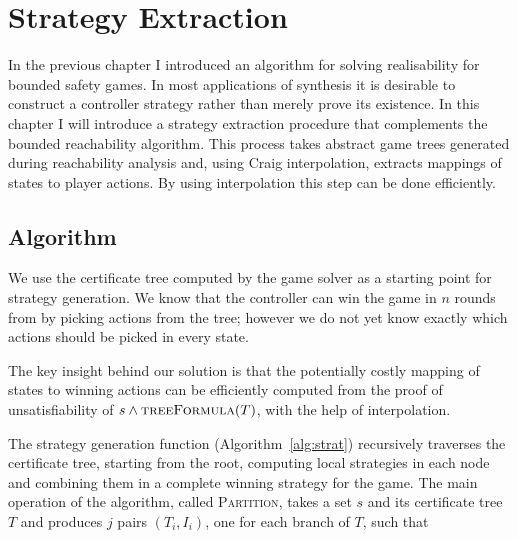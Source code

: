 \chapter{Strategy Extraction}
\label{ch:strategy}

\newcommand{\strategyext}[0]{\textsc{StrategyGen}\xspace}
\newcommand{\genstrategy}{\textsc{StrategyGen}}
\newcommand{\strategy}[0]{\textsc{Strategy}\xspace}
\newcommand{\partition}[0]{\textsc{Partition}\xspace}
\newcommand{\nextf}[0]{\textsc{Next}\xspace}
\newcommand{\ogametree}[0]{\mbox{\sc OppGT}}
\newcommand{\eagametree}[0]{\mbox{\sc AbsGT}'}
\newcommand{\pgametree}[0]{\mbox{\sc Cand}}
\newcommand{\apgametree}[0]{\mbox{\sc AbsSolvedGT}}
\newcommand{\opgametree}[0]{\mbox{\sc Spoiling}}

\renewcommand{\ss}[0]{\mathbf{s}}
\newcommand{\cc}[0]{\mathbf{c}}
\newcommand{\uu}[0]{\mathbf{u}}

\newtheorem{proposition}{Proposition}

In the previous chapter I introduced an algorithm for solving realisability for bounded safety games. In most applications of synthesis it is desirable to construct a controller strategy rather than merely prove its existence. In this chapter I will introduce a strategy extraction procedure that complements the bounded reachability algorithm. This process takes abstract game trees generated during reachability analysis and, using Craig interpolation, extracts mappings of states to player actions. By using interpolation this step can be done efficiently.

\section{Algorithm}

We use the certificate tree computed by the game solver as a
starting point for strategy generation.  We know that the
controller can win the game in $n$ rounds from by picking actions
from the tree; however we do not yet know exactly which actions
should be picked in every state.

The key insight behind our solution is that the potentially costly
mapping of states to winning actions can be efficiently computed
from the proof of unsatisfiability of $s \land \textsc{treeFormula}(T)$, with
the help of interpolation.

The strategy generation function (Algorithm~\ref{alg:strat}) recursively traverses the
certificate tree, starting from the root, computing local strategies
in each node and combining them in a complete winning strategy for the
game.  The main operation of the algorithm, called \textsc{Partition},
takes a set $s$ and its certificate tree $T$ and produces $j$ pairs
$(T_i, I_i)$, one for each branch of $T$, such that

